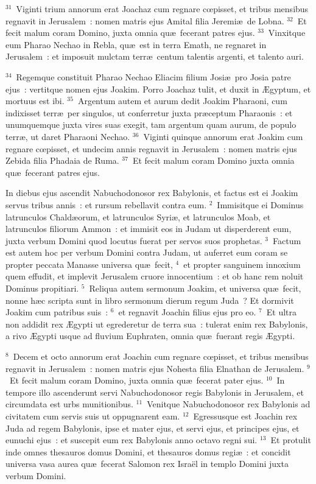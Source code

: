 ${}^{31}$~Viginti trium annorum erat Joachaz cum regnare cœpisset, et tribus mensibus regnavit in Jerusalem~: nomen matris ejus Amital filia Jeremi\ae\ de Lobna.
${}^{32}$~Et fecit malum coram Domino, juxta omnia qu\ae\ fecerant patres ejus.
${}^{33}$~Vinxitque eum Pharao Nechao in Rebla, qu\ae\ est in terra Emath, ne regnaret in Jerusalem~: et imposuit mulctam terr\ae\ centum talentis argenti, et talento auri.


${}^{34}$~Regemque constituit Pharao Nechao Eliacim filium Josi\ae\ pro Josia patre ejus~: vertitque nomen ejus Joakim. Porro Joachaz tulit, et duxit in \AE gyptum, et mortuus est ibi.
${}^{35}$~Argentum autem et aurum dedit Joakim Pharaoni, cum indixisset terr\ae\ per singulos, ut conferretur juxta pr\ae ceptum Pharaonis~: et unumquemque juxta vires suas exegit, tam argentum quam aurum, de populo terr\ae , ut daret Pharaoni Nechao.
${}^{36}$~Viginti quinque annorum erat Joakim cum regnare cœpisset, et undecim annis regnavit in Jerusalem~: nomen matris ejus Zebida filia Phadaia de Ruma.
${}^{37}$~Et fecit malum coram Domino juxta omnia qu\ae\ fecerant patres ejus.

\lettrine[lines=10,image=true,loversize=0.05,lraise=-0.03]{I}{}n diebus ejus ascendit Nabuchodonosor rex Babylonis, et factus est ei Joakim servus tribus annis~: et rursum rebellavit contra eum.
${}^{2}$~Immisitque ei Dominus latrunculos Chald\ae orum, et latrunculos Syri\ae , et latrunculos Moab, et latrunculos filiorum Ammon~: et immisit eos in Judam ut disperderent eum, juxta verbum Domini quod locutus fuerat per servos suos prophetas.
${}^{3}$~Factum est autem hoc per verbum Domini contra Judam, ut auferret eum coram se propter peccata Manasse universa qu\ae\ fecit,
${}^{4}$~et propter sanguinem innoxium quem effudit, et implevit Jerusalem cruore innocentium~: et ob hanc rem noluit Dominus propitiari.
${}^{5}$~Reliqua autem sermonum Joakim, et universa qu\ae\ fecit, nonne h\ae c scripta sunt in libro sermonum dierum regum Juda~? Et dormivit Joakim cum patribus suis~:
${}^{6}$~et regnavit Joachin filius ejus pro eo.
${}^{7}$~Et ultra non addidit rex \AE gypti ut egrederetur de terra sua~: tulerat enim rex Babylonis, a rivo \AE gypti usque ad fluvium Euphraten, omnia qu\ae\ fuerant regis \AE gypti.


${}^{8}$~Decem et octo annorum erat Joachin cum regnare cœpisset, et tribus mensibus regnavit in Jerusalem~: nomen matris ejus Nohesta filia Elnathan de Jerusalem.
${}^{9}$~Et fecit malum coram Domino, juxta omnia qu\ae\ fecerat pater ejus.
${}^{10}$~In tempore illo ascenderunt servi Nabuchodonosor regis Babylonis in Jerusalem, et circumdata est urbs munitionibus.
${}^{11}$~Venitque Nabuchodonosor rex Babylonis ad civitatem cum servis suis ut oppugnarent eam.
${}^{12}$~Egressusque est Joachin rex Juda ad regem Babylonis, ipse et mater ejus, et servi ejus, et principes ejus, et eunuchi ejus~: et suscepit eum rex Babylonis anno octavo regni sui.
${}^{13}$~Et protulit inde omnes thesauros domus Domini, et thesauros domus regi\ae~: et concidit universa vasa aurea qu\ae\ fecerat Salomon rex Isra\"el in templo Domini juxta verbum Domini.


